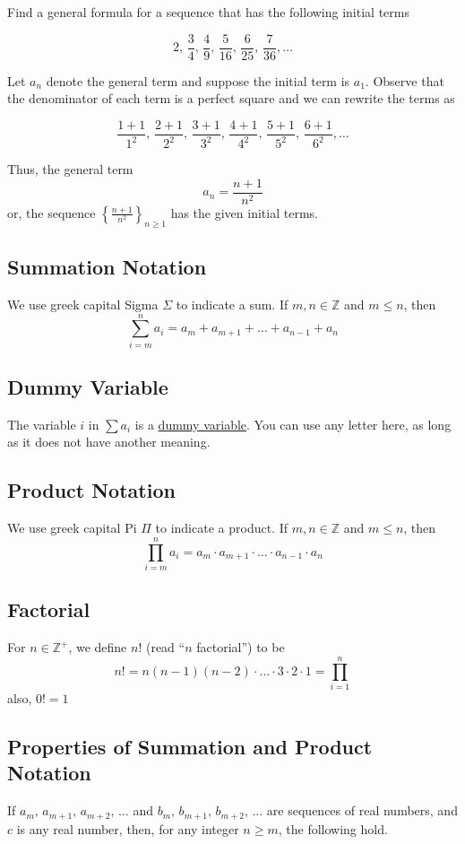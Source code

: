 \begin{example}
    Find a general formula for a sequence that has the following initial terms

    $$2,\, \frac34,\, \frac49,\, \frac{5}{16},\, \frac{6}{25},\, \frac{7}{36},\dots$$

    Let $a_n$ denote the general term and suppose the initial term is $a_1$. Observe that the denominator of each term is a perfect square and we can rewrite the terms as

    $$\frac{1+1}{1^2},\, \frac{2+1}{2^2},\, \frac{3+1}{3^2},\, \frac{4+1}{4^2},\, \frac{5+1}{5^2},\, \frac{6+1}{6^2},\dots$$

    Thus, the general term $$a_n = \frac{n+1}{n^2}$$ or, the sequence $\left\{\frac{n+1}{n^2}\right\}_{n\geq 1}$ has the given initial terms.
\end{example}

\subsection{Summation Notation}
We use greek capital Sigma $\Sigma$ to indicate a sum. If $m,n\in\mathbb Z$ and $m\leq n$, then $$\sum_{i=m}^n a_i = a_m + a_{m+1} + \dots + a_{n-1} + a_n$$

\subsection{Dummy Variable}
\begin{example}
    The variable $i$ in $\sum a_i$ is a \underline{dummy variable}. You can use any letter here, as long as it does not have another meaning.
\end{example}

\subsection{Product Notation}
We use greek capital Pi $\Pi$ to indicate a product. If $m,n\in\mathbb Z$ and $m\leq n$, then $$\prod_{i=m}^n a_i = a_m\cdot a_{m+1}\cdot\dots\cdot a_{n-1}\cdot a_n$$

\subsection{Factorial}
For $n\in\mathbb Z^+$, we define $n!$ (read ``$n$ factorial'') to be $$n! = n(n-1)(n-2)\cdot\dots\cdot 3\cdot 2\cdot 1 = \prod_{i=1}^n$$ also, $0!=1$

\subsection{Properties of Summation and Product Notation}
If $a_m,\, a_{m+1},\, a_{m+2},\,\dots$ and $b_m,\, b_{m+1},\, b_{m+2},\,\dots$ are sequences of real numbers, and $c$ is any real number, then, for any integer $n\geq m$, the following hold.

